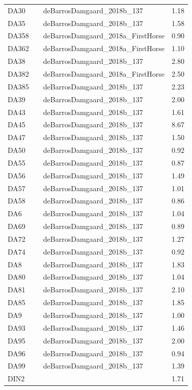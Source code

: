 \begin{longtable}[t]{lllr}
DA30 &  & deBarrosDamgaard\_2018b\_137 & 1.18\\
DA35 &  & deBarrosDamgaard\_2018b\_137 & 1.58\\
DA358 &  & deBarrosDamgaard\_2018a\_FirstHorse & 0.90\\
DA362 &  & deBarrosDamgaard\_2018a\_FirstHorse & 1.10\\
DA38 &  & deBarrosDamgaard\_2018b\_137 & 2.80\\
DA382 &  & deBarrosDamgaard\_2018a\_FirstHorse & 2.50\\
DA385 &  & deBarrosDamgaard\_2018b\_137 & 2.23\\
DA39 &  & deBarrosDamgaard\_2018b\_137 & 2.00\\
DA43 &  & deBarrosDamgaard\_2018b\_137 & 1.61\\
DA45 &  & deBarrosDamgaard\_2018b\_137 & 8.67\\
DA47 &  & deBarrosDamgaard\_2018b\_137 & 1.50\\
DA50 &  & deBarrosDamgaard\_2018b\_137 & 0.92\\
DA55 &  & deBarrosDamgaard\_2018b\_137 & 0.87\\
DA56 &  & deBarrosDamgaard\_2018b\_137 & 1.49\\
DA57 &  & deBarrosDamgaard\_2018b\_137 & 1.01\\
DA58 &  & deBarrosDamgaard\_2018b\_137 & 0.86\\
DA6 &  & deBarrosDamgaard\_2018b\_137 & 1.04\\
DA69 &  & deBarrosDamgaard\_2018b\_137 & 0.89\\
DA72 &  & deBarrosDamgaard\_2018b\_137 & 1.27\\
DA74 &  & deBarrosDamgaard\_2018b\_137 & 0.92\\
DA8 &  & deBarrosDamgaard\_2018b\_137 & 1.83\\
DA80 &  & deBarrosDamgaard\_2018b\_137 & 1.04\\
DA81 &  & deBarrosDamgaard\_2018b\_137 & 2.10\\
DA85 &  & deBarrosDamgaard\_2018b\_137 & 1.85\\
DA9 &  & deBarrosDamgaard\_2018b\_137 & 1.00\\
DA93 &  & deBarrosDamgaard\_2018b\_137 & 1.46\\
DA95 &  & deBarrosDamgaard\_2018b\_137 & 2.00\\
DA96 &  & deBarrosDamgaard\_2018b\_137 & 0.94\\
DA99 &  & deBarrosDamgaard\_2018b\_137 & 1.39\\
DIN2 &  &  & 1.71\\

\end{longtable}
